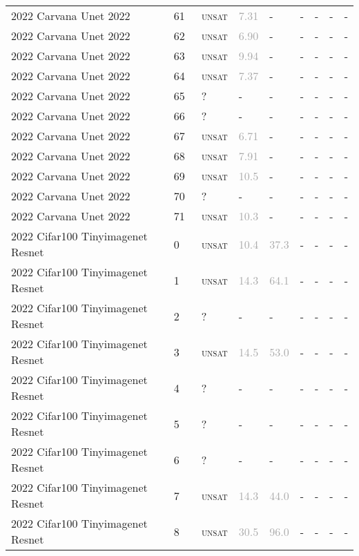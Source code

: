 \begin{center}
{\begin{longtable}{@{}lllllllll@{}}
2022 Carvana Unet 2022 & 61 & ~\textsc{unsat} & \textcolor{darkgray}{7.31} & - & - & - & - & - \\
2022 Carvana Unet 2022 & 62 & ~\textsc{unsat} & \textcolor{darkgray}{6.90} & - & - & - & - & - \\
2022 Carvana Unet 2022 & 63 & ~\textsc{unsat} & \textcolor{darkgray}{9.94} & - & - & - & - & - \\
2022 Carvana Unet 2022 & 64 & ~\textsc{unsat} & \textcolor{darkgray}{7.37} & - & - & - & - & - \\
2022 Carvana Unet 2022 & 65 & ~? & - & - & - & - & - & - \\
2022 Carvana Unet 2022 & 66 & ~? & - & - & - & - & - & - \\
2022 Carvana Unet 2022 & 67 & ~\textsc{unsat} & \textcolor{darkgray}{6.71} & - & - & - & - & - \\
2022 Carvana Unet 2022 & 68 & ~\textsc{unsat} & \textcolor{darkgray}{7.91} & - & - & - & - & - \\
2022 Carvana Unet 2022 & 69 & ~\textsc{unsat} & \textcolor{darkgray}{10.5} & - & - & - & - & - \\
2022 Carvana Unet 2022 & 70 & ~? & - & - & - & - & - & - \\
2022 Carvana Unet 2022 & 71 & ~\textsc{unsat} & \textcolor{darkgray}{10.3} & - & - & - & - & - \\
\midrule
2022 Cifar100 Tinyimagenet Resnet & 0 & ~\textsc{unsat} & \textcolor{darkgray}{10.4} & \textcolor{darkgray}{37.3} & - & - & - & - \\
2022 Cifar100 Tinyimagenet Resnet & 1 & ~\textsc{unsat} & \textcolor{darkgray}{14.3} & \textcolor{darkgray}{64.1} & - & - & - & - \\
2022 Cifar100 Tinyimagenet Resnet & 2 & ~? & - & - & - & - & - & - \\
2022 Cifar100 Tinyimagenet Resnet & 3 & ~\textsc{unsat} & \textcolor{darkgray}{14.5} & \textcolor{darkgray}{53.0} & - & - & - & - \\
2022 Cifar100 Tinyimagenet Resnet & 4 & ~? & - & - & - & - & - & - \\
2022 Cifar100 Tinyimagenet Resnet & 5 & ~? & - & - & - & - & - & - \\
2022 Cifar100 Tinyimagenet Resnet & 6 & ~? & - & - & - & - & - & - \\
2022 Cifar100 Tinyimagenet Resnet & 7 & ~\textsc{unsat} & \textcolor{darkgray}{14.3} & \textcolor{darkgray}{44.0} & - & - & - & - \\
2022 Cifar100 Tinyimagenet Resnet & 8 & ~\textsc{unsat} & \textcolor{darkgray}{30.5} & \textcolor{darkgray}{96.0} & - & - & - & - \\

\end{longtable}}
\end{center}
